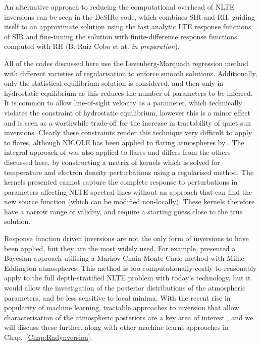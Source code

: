 An alternative approach to reducing the computational overhead of NLTE inversions can be seen in the DeSIRe code, which combines SIR and RH, guiding itself to an approximate solution using the fast analytic LTE response functions of SIR and fine-tuning the solution with finite-difference response functions computed with RH (B. Ruiz Cobo et at. \emph{in preparation}).

All of the codes discussed here use the Levenberg-Marquadt regression method with different varieties of regularisation to enforce smooth solutions.
Additionally, only the statistical equilibrium solution is considered, and then only in hydrostatic equilibrium as this reduces the number of parameters to be inferred.
It is common to allow line-of-sight velocity as a parameter, which technically violates the constraint of hydrostatic equilibrium, however this is a minor effect and is seen as a worthwhile trade-off for the increase in tractability of quiet sun inversions.
Clearly these constraints render this technique very difficult to apply to flares, although NICOLE has been applied to flaring atmospheres by \citet{Kuridze2018}.
The integral approach of \citep{Metcalf1990a} was also applied to flares and differs from the others discussed here, by constructing a matrix of kernels which is solved for temperature and electron density perturbations using a regularised method.
The kernels presented cannot capture the complete response to perturbations in parameters affecting NLTE spectral lines without an approach that can find the new source function (which can be modified non-locally).
These kernels therefore have a narrow range of validity, and require a starting guess close to the true solution.

Response function driven inversions are not the only form of inversions to have been applied, but they are the most widely used.
For example, \citet{AsensioRamos2007} presented a Bayesian approach utilising a Markov Chain Monte Carlo method with Milne-Eddington atmospheres.
This method is too computationally costly to reasonably apply to the full depth-stratified NLTE problem with today's technology, but it would allow the investigation of the posterior distributions of the atmospheric parameters, and be less sensitive to local minima.
With the recent rise in popularity of machine learning, tractable approaches to inversion that allow characterisation of the atmospheric posteriors are a key area of interest \citep[e.g.][]{Osborne2019, DiazBaso2021}, and we will discuss these further, along with other machine learnt approaches in Chap.~\ref{Chap:Radynversion}.


